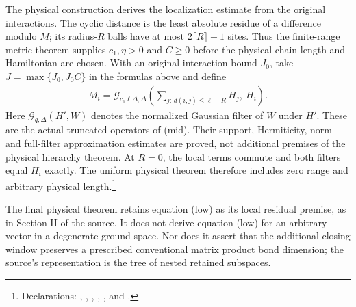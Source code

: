 \documentclass{article}
\begin{document}
The physical construction derives the localization estimate from the
original interactions. The cyclic distance is the least absolute residue
of a difference modulo $M$; its radius-$R$ balls have at most
$2\lceil R\rceil+1$ sites. Thus the finite-range metric theorem supplies
$c_1,\eta>0$ and $C\ge0$ before the physical chain length and Hamiltonian
are chosen. With an original interaction bound $J_0$, take
$J=\max\{J_0,J_0C\}$ in the formulas above and define
\begin{align}
 M_i=\mathcal G_{c_1\ell\Delta,\Delta}
   \left(\sum_{j:\,d(i,j)\le\ell-R}H_j,\ H_i\right).
 \label{eq:hastings05_actual_periodic_terms}
\end{align}
Here $\mathcal G_{q,\Delta}(H',W)$ denotes the normalized Gaussian filter
of $W$ under $H'$. These are the actual truncated operators of (mid).
Their support, Hermiticity, norm and full-filter approximation estimates
are proved, not additional premises of the physical hierarchy theorem.
At $R=0$, the local terms commute and both filters equal $H_i$ exactly.
The uniform physical theorem therefore includes zero range and arbitrary
physical length.\footnote{Declarations:
,
,
,
,
, and
.}

The final physical theorem retains equation (low) as its local residual
premise, as in Section II of the source. It does not derive equation (low) for
an arbitrary vector in a degenerate ground space. Nor does it assert
that the additional closing window preserves a prescribed conventional
matrix product bond dimension; the source's representation is the tree
of nested retained subspaces.


\end{document}
